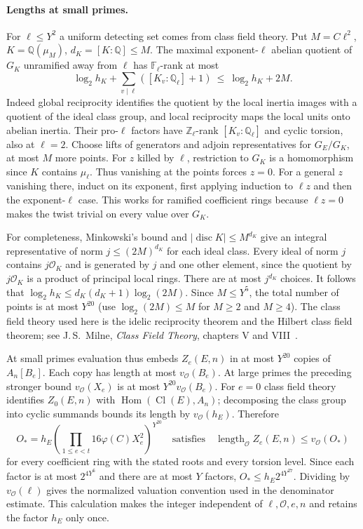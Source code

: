 \paragraph{Lengths at small primes.}
For $\ell\le Y^2$ a uniform detecting set comes from class field theory.
Put $M=C\ell^2$, $K=\mathbb Q(\mu_M)$, $d_K=[K:\mathbb Q]\le M$.
The maximal exponent-$\ell$ abelian quotient of $G_K$ unramified away
from $\ell$ has $\mathbb F_\ell$-rank at most
\[
 \log_2 h_K+\sum_{v\mid\ell}([K_v:\mathbb Q_\ell]+1)
 \ \le\ \log_2 h_K+2M .
\]
Indeed global reciprocity identifies the quotient by the local inertia
images with a quotient of the ideal class group, and local reciprocity
maps the local units onto abelian inertia. Their pro-$\ell$ factors
have $\mathbb Z_\ell$-rank $[K_v:\mathbb Q_\ell]$ and cyclic torsion,
also at $\ell=2$. Choose lifts of generators and adjoin representatives
for $G_E/G_K$, at most $M$ more points.
For $z$ killed by $\ell$, restriction to $G_K$ is a homomorphism
since $K$ contains $\mu_\ell$. Thus vanishing at the points forces
$z=0$. For a general $z$ vanishing there, induct on its exponent,
first applying induction to $\ell z$ and then the exponent-$\ell$ case.
This works for ramified coefficient rings because $\ell z=0$ makes
the twist trivial on every value over $G_K$.

For completeness, Minkowski's bound and $|\operatorname{disc}K|\le M^{d_K}$
give an integral representative of norm $j\le(2M)^{d_K}$ for each
ideal class. Every ideal of norm $j$ contains $j\mathcal O_K$ and
is generated by $j$ and one other element, since the quotient by
$j\mathcal O_K$ is a product of principal local rings. There are at most
$j^{d_K}$ choices. It follows that $\log_2 h_K\le
d_K(d_K+1)\log_2(2M)$. Since $M\le Y^5$, the total number of points
is at most $Y^{20}$ (use $\log_2(2M)\le M$ for $M\ge2$ and $M\ge4$).
The class field theory used here is the idelic reciprocity theorem
and the Hilbert class field theorem; see J.\,S.~Milne,
\emph{Class Field Theory}, chapters V and VIII~\cite{milneCFT}.

At small primes evaluation thus embeds $Z_e(E,n)$ in at most
$Y^{20}$ copies of $A_n[B_e]$. Each copy has length at most
$v_{\mathcal O}(B_e)$. At large primes the preceding stronger
bound $v_{\mathcal O}(X_e)$ is at most $Y^{20}v_{\mathcal O}(B_e)$.
For $e=0$ class field theory identifies
$Z_0(E,n)$ with $\operatorname{Hom}(\operatorname{Cl}(E),A_n)$;
decomposing the class group into cyclic summands bounds its length by
$v_{\mathcal O}(h_E)$. Therefore
\[
 O_*=h_E\left(\prod_{1\le e<t}16\varphi(C)X_e^2\right)^{Y^{20}}
 \quad\text{satisfies}\quad
 \operatorname{length}_{\mathcal O} Z_e(E,n)\le v_{\mathcal O}(O_*)
\]
for every coefficient ring with the stated roots and every torsion level. Since each factor is
at most $2^{4Y^6}$ and there are at most $Y$ factors,
$O_*\le h_E2^{4Y^{27}}$. Dividing by $v_{\mathcal O}(\ell)$
gives the normalized valuation convention used in the denominator
estimate. This calculation makes the integer independent of
$\ell,\mathcal O,e,n$ and retains the factor $h_E$ only once.

